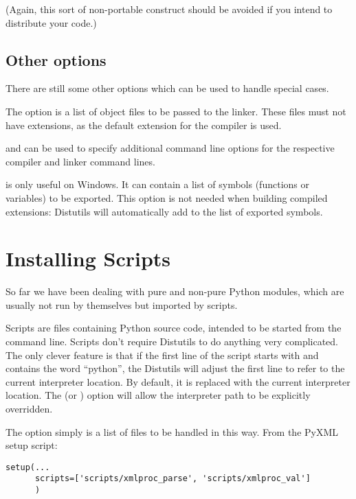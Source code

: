 \documentclass{manual}
\begin{document}
(Again, this sort of non-portable construct should be avoided if you
intend to distribute your code.)


\subsection{Other options}

There are still some other options which can be used to handle special
cases.

The  option is a list of object files to be passed
to the linker. These files must not have extensions, as the default
extension for the compiler is used.

 and  can be used
to specify additional command line options for the respective compiler and
linker command lines.

 is only useful on Windows.  It can contain a list
of symbols (functions or variables) to be exported. This option
is not needed when building compiled extensions: Distutils 
will automatically add 
to the list of exported symbols.

\section{Installing Scripts}
So far we have been dealing with pure and non-pure Python modules,
which are usually not run by themselves but imported by scripts.

Scripts are files containing Python source code, intended to be
started from the command line.  Scripts don't require Distutils to do
anything very complicated.  The only clever feature is that if the
first line of the script starts with \code{\#!} and contains the word
``python'', the Distutils will adjust the first line to refer to the
current interpreter location. By default, it is replaced with the
current interpreter location.  The  (or
) option will allow the interpreter path to be
explicitly overridden.

The  option simply is a list of files to be handled
in this way.  From the PyXML setup script:

\begin{verbatim}
setup(... 
      scripts=['scripts/xmlproc_parse', 'scripts/xmlproc_val']
      )
\end{verbatim}
\end{document}
